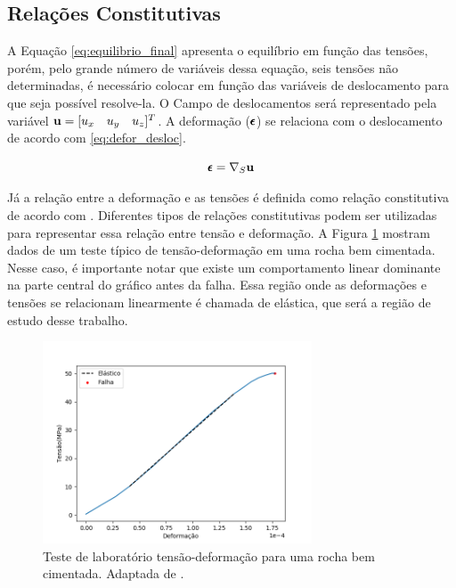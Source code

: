 \subsection{Relações Constitutivas}

A Equação \eqref{eq:equilibrio_final} apresenta o equilíbrio em função das tensões, porém, pelo grande número de variáveis dessa equação, seis tensões não determinadas, é necessário colocar em função das variáveis de deslocamento para que seja possível resolve-la. O Campo de deslocamentos será representado pela variável $\mathbf{u} = [u_x \quad u_y \quad u_z]^T$. A deformação ($\pmb{\epsilon}$) se relaciona com o deslocamento de acordo com \eqref{eq:defor_desloc}. 

\begin{equation}
\label{eq:defor_desloc}
\pmb{\epsilon} = \nabla_S \mathbf{u}
\end{equation}


Já a relação entre a deformação e as tensões é definida como relação constitutiva de acordo com \citet{ResGeomec}. Diferentes tipos de relações constitutivas podem ser utilizadas para representar essa relação entre tensão e deformação. A Figura \ref{fig:stress_strain} mostram dados de um teste típico de tensão-deformação em uma rocha bem cimentada. Nesse caso, é importante notar que existe um comportamento linear dominante na parte central do gráfico antes da falha. Essa região onde as deformações e tensões se relacionam linearmente é chamada de elástica, que será a região de estudo desse trabalho. %


\begin{figure}[!htbp]
\centering
\includegraphics[width=8cm]{chap01/figs/stress_strain.png}
\caption{Teste de laboratório tensão-deformação para uma rocha bem cimentada. Adaptada de \citet{ResGeomec}.}
\label{fig:stress_strain}
\end{figure}


